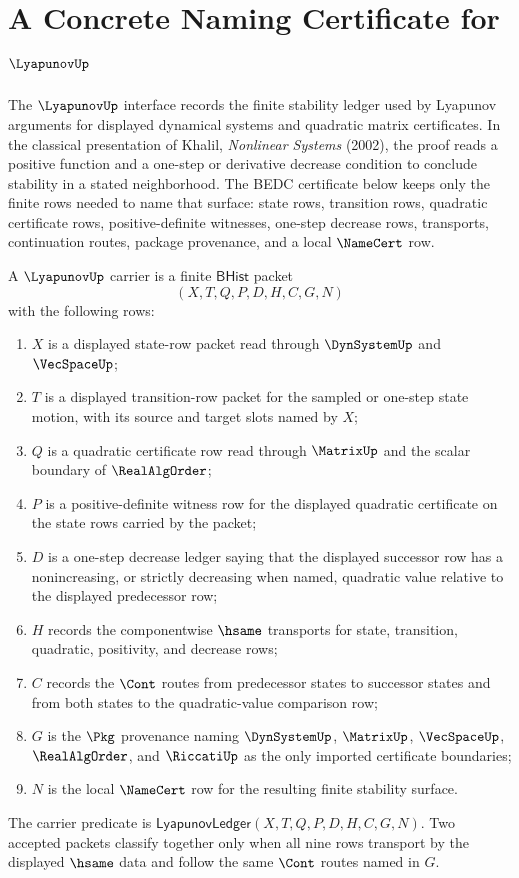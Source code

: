 \chapter{A Concrete Naming Certificate for $\LyapunovUp$}
\label{ch:concrete-instances-lyapunov-namecert}

The $\LyapunovUp$ interface records the finite stability ledger used by
Lyapunov arguments for displayed dynamical systems and quadratic matrix
certificates. In the classical presentation of Khalil, \emph{Nonlinear
Systems} (2002), the proof reads a positive function and a one-step or
derivative decrease condition to conclude stability in a stated neighborhood.
The BEDC certificate below keeps only the finite rows needed to name that
surface: state rows, transition rows, quadratic certificate rows,
positive-definite witnesses, one-step decrease rows, transports, continuation
routes, package provenance, and a local $\NameCert$ row.

\begin{definition}
\label{def:lyapunov-bhist-carrier}
A $\LyapunovUp$ carrier is a finite $\mathsf{BHist}$ packet
$$
(X,T,Q,P,D,H,C,G,N)
$$
with the following rows:
\begin{enumerate}
\item $X$ is a displayed state-row packet read through $\DynSystemUp$ and
$\VecSpaceUp$;
\item $T$ is a displayed transition-row packet for the sampled or one-step
state motion, with its source and target slots named by $X$;
\item $Q$ is a quadratic certificate row read through $\MatrixUp$ and the
scalar boundary of $\RealAlgOrder$;
\item $P$ is a positive-definite witness row for the displayed quadratic
certificate on the state rows carried by the packet;
\item $D$ is a one-step decrease ledger saying that the displayed successor row
has a nonincreasing, or strictly decreasing when named, quadratic value relative
to the displayed predecessor row;
\item $H$ records the componentwise $\hsame$ transports for state, transition,
quadratic, positivity, and decrease rows;
\item $C$ records the $\Cont$ routes from predecessor states to successor
states and from both states to the quadratic-value comparison row;
\item $G$ is the $\Pkg$ provenance naming $\DynSystemUp$, $\MatrixUp$,
$\VecSpaceUp$, $\RealAlgOrder$, and $\RiccatiUp$ as the only imported
certificate boundaries;
\item $N$ is the local $\NameCert$ row for the resulting finite stability
surface.
\end{enumerate}
The carrier predicate is
$\mathsf{LyapunovLedger}(X,T,Q,P,D,H,C,G,N)$. Two accepted packets classify
together only when all nine rows transport by the displayed $\hsame$ data and
follow the same $\Cont$ routes named in $G$.
\end{definition}

